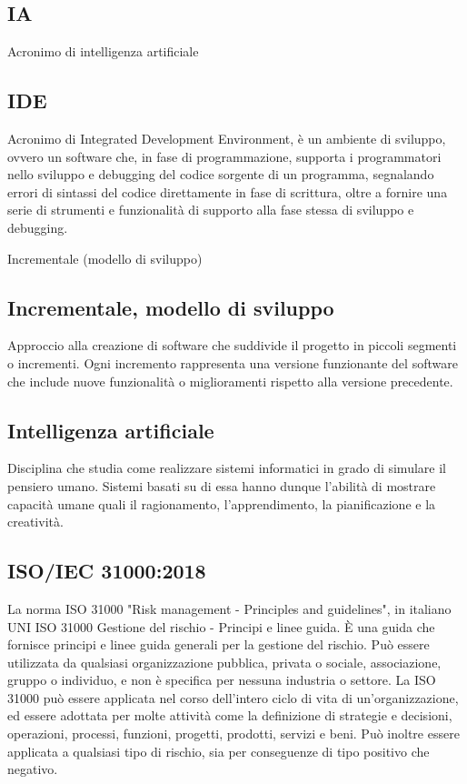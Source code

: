 \hypertarget{sec:ia}{}
\subsection*{IA}
Acronimo di intelligenza artificiale

\hypertarget{sec:ide}{}
\subsection*{IDE}
Acronimo di Integrated Development Environment, è un ambiente di sviluppo, ovvero un software che, in fase di programmazione, supporta i programmatori 
nello sviluppo e debugging del codice sorgente di un programma, segnalando errori di sintassi del codice direttamente in fase di scrittura, oltre a fornire 
una serie di strumenti e funzionalità di supporto alla fase stessa di sviluppo e debugging.

\hypertarget{sec:modello_incrementale}{Incrementale (modello di sviluppo)}
\subsection*{Incrementale, modello di sviluppo}
Approccio alla creazione di software che suddivide il progetto in piccoli segmenti o incrementi. 
Ogni incremento rappresenta una versione funzionante del software che include nuove funzionalità o miglioramenti rispetto alla versione precedente.

\hypertarget{sec:intelligenza_artificiale}{}
\subsection*{Intelligenza artificiale}
Disciplina che studia come realizzare sistemi informatici in grado di simulare il pensiero umano. Sistemi basati su di essa hanno dunque l'abilità di mostrare 
capacità umane quali il ragionamento, l'apprendimento, la pianificazione e la creatività.

\hypertarget{ISO/IEC 31000:2018}{}
\subsection*{ISO/IEC 31000:2018}
La norma ISO 31000 "Risk management - Principles and guidelines", 
in italiano UNI ISO 31000 Gestione del rischio - Principi e linee guida. 
È una guida che fornisce principi e linee guida generali per la gestione del rischio. 
Può essere utilizzata da qualsiasi organizzazione pubblica, privata o sociale, associazione, gruppo o individuo, e non è specifica per nessuna industria o settore.
La ISO 31000 può essere applicata nel corso dell'intero ciclo di vita di un'organizzazione, ed essere adottata per molte attività come la definizione di strategie e decisioni, operazioni, processi, funzioni, progetti, prodotti, servizi e beni.
Può inoltre essere applicata a qualsiasi tipo di rischio, sia per conseguenze di tipo positivo che negativo. 

